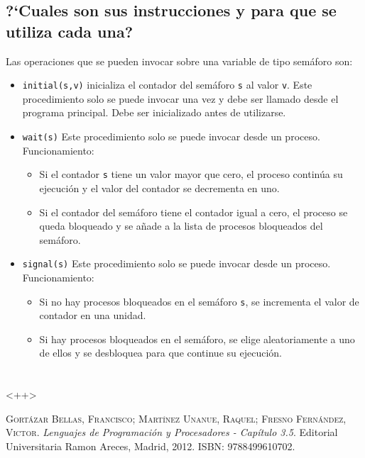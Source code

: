 \documentclass{article}
\begin{document}
\subsection{?`Cuales son sus instrucciones y para que se utiliza cada una?}
Las operaciones que se pueden invocar sobre una variable de tipo sem\'aforo son:
\begin{itemize}
\item \texttt{initial(s,v)} inicializa el contador del sem\'aforo \texttt{s} al valor \texttt{v}. Este procedimiento solo se puede invocar una vez y debe ser llamado desde el programa principal. Debe ser inicializado antes de utilizarse.
\item \texttt{wait(s)} Este procedimiento solo se puede invocar desde un proceso. Funcionamiento:
  \begin{itemize}
    \item Si el contador \texttt{s} tiene un valor mayor que cero, el proceso contin\'ua su ejecuci\'on y el valor del contador se decrementa en uno.
    \item Si el contador del sem\'aforo tiene el contador igual a cero, el proceso se queda bloqueado y se a\~{n}ade a la lista de procesos bloqueados del sem\'aforo.
  \end{itemize}
\item \texttt{signal(s)} Este procedimiento solo se puede invocar desde un proceso. Funcionamiento:
  \begin{itemize}
    \item Si no hay procesos bloqueados en el sem\'aforo \texttt{s}, se incrementa el valor de contador en una unidad.
    \item Si hay procesos bloqueados en el sem\'aforo, se elige aleatoriamente a uno de ellos y se desbloquea para que continue su ejecuci\'on.
  \end{itemize}
\end{itemize}

\section{}

<++>
\newpage
\begin{thebibliography}{99}
	\textsc{Gort\'azar Bellas, Francisco; Mart\'inez Unanue, Raquel; Fresno Fern\'andez, Victor}. \textit{Lenguajes de Programaci\'on y Procesadores - Cap\'itulo 3.5}. Editorial Universitaria Ramon Areces, Madrid, 2012. \textsc{ISBN: 9788499610702}.
\end{thebibliography}
\end{document}
